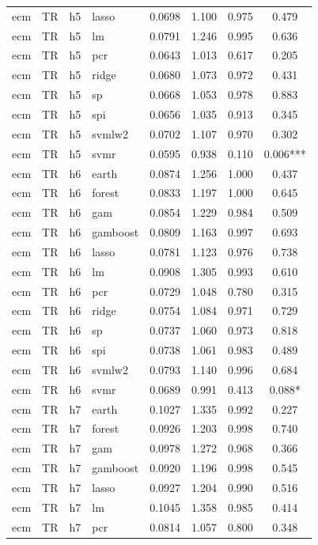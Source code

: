 \begin{ThreePartTable}
\begin{longtable}[t]{llclcccc}
ecm & TR & h5 & lasso & 0.0698 & 1.100 & 0.975 & 0.479\\
ecm & TR & h5 & lm & 0.0791 & 1.246 & 0.995 & 0.636\\
ecm & TR & h5 & pcr & 0.0643 & 1.013 & 0.617 & 0.205\\
ecm & TR & h5 & ridge & 0.0680 & 1.073 & 0.972 & 0.431\\
ecm & TR & h5 & sp & 0.0668 & 1.053 & 0.978 & 0.883\\
ecm & TR & h5 & spi & 0.0656 & 1.035 & 0.913 & 0.345\\
ecm & TR & h5 & svmlw2 & 0.0702 & 1.107 & 0.970 & 0.302\\
ecm & TR & h5 & svmr & 0.0595 & 0.938 & 0.110 & 0.006***\\
\addlinespace
ecm & TR & h6 & earth & 0.0874 & 1.256 & 1.000 & 0.437\\
ecm & TR & h6 & forest & 0.0833 & 1.197 & 1.000 & 0.645\\
ecm & TR & h6 & gam & 0.0854 & 1.229 & 0.984 & 0.509\\
ecm & TR & h6 & gamboost & 0.0809 & 1.163 & 0.997 & 0.693\\
ecm & TR & h6 & lasso & 0.0781 & 1.123 & 0.976 & 0.738\\
ecm & TR & h6 & lm & 0.0908 & 1.305 & 0.993 & 0.610\\
ecm & TR & h6 & pcr & 0.0729 & 1.048 & 0.780 & 0.315\\
ecm & TR & h6 & ridge & 0.0754 & 1.084 & 0.971 & 0.729\\
ecm & TR & h6 & sp & 0.0737 & 1.060 & 0.973 & 0.818\\
ecm & TR & h6 & spi & 0.0738 & 1.061 & 0.983 & 0.489\\
ecm & TR & h6 & svmlw2 & 0.0793 & 1.140 & 0.996 & 0.684\\
ecm & TR & h6 & svmr & 0.0689 & 0.991 & 0.413 & 0.088*\\
\addlinespace
ecm & TR & h7 & earth & 0.1027 & 1.335 & 0.992 & 0.227\\
ecm & TR & h7 & forest & 0.0926 & 1.203 & 0.998 & 0.740\\
ecm & TR & h7 & gam & 0.0978 & 1.272 & 0.968 & 0.366\\
ecm & TR & h7 & gamboost & 0.0920 & 1.196 & 0.998 & 0.545\\
ecm & TR & h7 & lasso & 0.0927 & 1.204 & 0.990 & 0.516\\
ecm & TR & h7 & lm & 0.1045 & 1.358 & 0.985 & 0.414\\
ecm & TR & h7 & pcr & 0.0814 & 1.057 & 0.800 & 0.348\\

\end{longtable}
\end{ThreePartTable}
